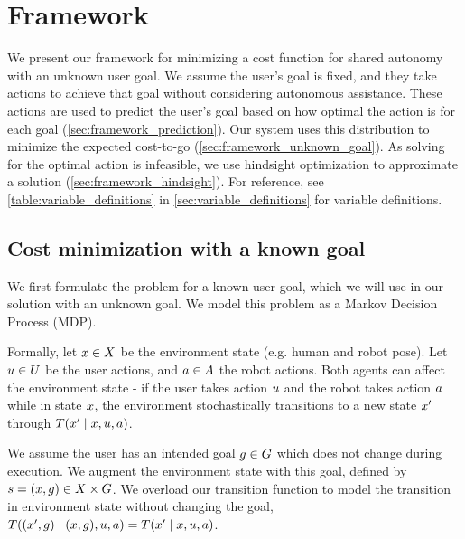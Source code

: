 \section{Framework}
\label{sec:framework}


\graphicspath{{./}{./images_rss_2015/}{./images_hri_2016/}}




We present our framework for minimizing a cost function for shared autonomy with an unknown user goal. We assume the user's goal is fixed, and they take actions to achieve that goal without considering autonomous assistance. These actions are used to predict the user's goal based on how optimal the action is for each goal (\cref{sec:framework_prediction}). Our system uses this distribution to minimize the expected cost-to-go  (\cref{sec:framework_unknown_goal}). As solving for the optimal action is infeasible, we use hindsight optimization to approximate a solution (\cref{sec:framework_hindsight}). For reference, see \cref{table:variable_definitions} in \cref{sec:variable_definitions} for variable definitions.

\subsection{Cost minimization with a known goal}
\label{sec:framework_known_goal}

We first formulate the problem for a known user goal, which we will use in our solution with an unknown goal. We model this problem as a Markov Decision Process (MDP). 

Formally, let $x \in X$ be the environment state (e.g. human and robot pose). Let $u \in U$ be the user actions, and $a \in A$ the robot actions. Both agents can affect the environment state - if the user takes action $u$ and the robot takes action $a$ while in state $x$, the environment stochastically transitions to a new state $x'$ through $T(x' \mid x, u, a)$. 

We assume the user has an intended goal $g \in G$ which does not change during execution. We augment the environment state with this goal, defined by $s = \left(x, g\right) \in X \times G$. We overload our transition function to model the transition in environment state without changing the goal, $T( (x', g) \mid (x, g), u, a) = T(x' \mid x, u, a)$.

